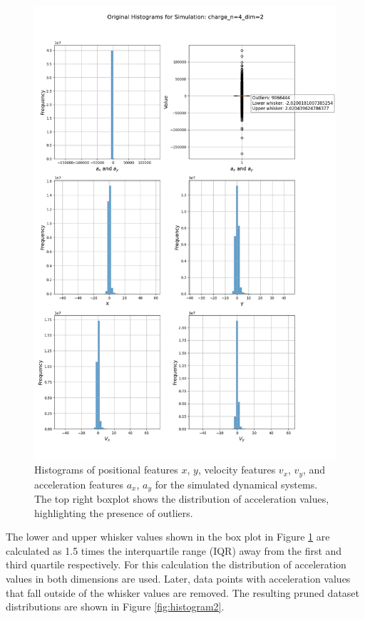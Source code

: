 \documentclass{article}
\begin{document}
\begin{figure}[H]
    \centering
    \includegraphics[width=\textwidth]{Data_Pruning/original_hist_charge_n=4_dim=2.png}
    \caption{Histograms of positional features $x$, $y$, velocity features $v_x$, $v_y$, and acceleration features $a_x$, $a_y$ for the simulated dynamical systems. The top right boxplot shows the distribution of acceleration values, highlighting the presence of outliers.}
    \label{fig:histogram1}
\end{figure}


The lower and upper whisker values shown in the box plot in Figure \ref{fig:histogram1} are calculated as 1.5 times the interquartile range (IQR) away from the first and third quartile respectively. For this calculation the distribution of acceleration values in both dimensions are used. Later, data points with acceleration values that fall outside of the whisker values are removed. The resulting pruned dataset distributions are shown in Figure \ref{fig:histogram2}.
\end{document}
